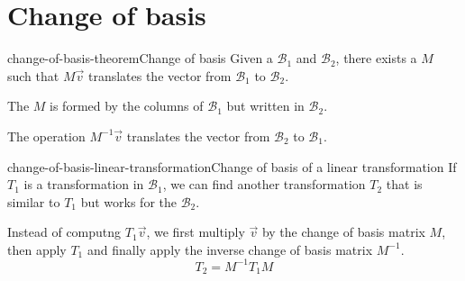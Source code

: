 \documentclass[preview]{standalone}
\begin{document}
\genpage

\section{Change of basis}

\begin{snippettheorem}{change-of-basis-theorem}{Change of basis}
    Given a \basis \(\mathcal{B}_1\) and \(\mathcal{B}_2\),
    there exists a \matrix \(M\) such that \(M\vec{v}\) translates
    the vector from \(\mathcal{B}_1\) to \(\mathcal{B}_2\).
    
    The \matrix \(M\) is formed by the columns of \(\mathcal{B}_1\) but written in
    \(\mathcal{B}_2\).
    
    The operation \(M^{-1}\vec{v}\) translates
    the vector from \(\mathcal{B}_2\) to \(\mathcal{B}_1\).
\end{snippettheorem}

\begin{snippetproposition}{change-of-basis-linear-transformation}{Change of basis of a linear transformation}
    If \(T_1\) is a transformation in \(\mathcal{B}_1\), we can find another
    transformation \(T_2\) that is similar to \(T_1\) but works for the \basis \(\mathcal{B}_2\).
    
    Instead of computng \(T_1\vec{v}\), we first multiply \(\vec{v}\) by the
    change of basis matrix \(M\), then apply \(T_1\) and finally apply the inverse change of basis matrix \(M^{-1}\).
    \[
        T_2 = M^{-1}T_1M
    \]
\end{snippetproposition}
\end{document}
